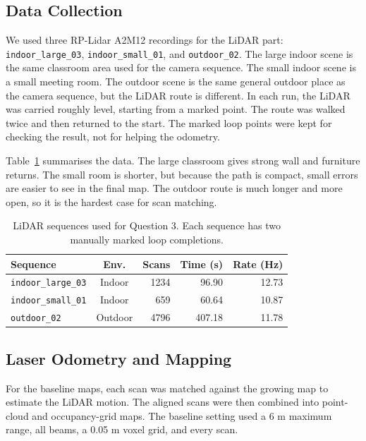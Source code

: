 \documentclass[conference]{IEEEtran}
\begin{document}
\subsection{Data Collection}

We used three RP-Lidar A2M12 recordings for the LiDAR part: \texttt{indoor\_large\_03}, \texttt{indoor\_small\_01}, and \texttt{outdoor\_02}. The large indoor scene is the same classroom area used for the camera sequence. The small indoor scene is a small meeting room. The outdoor scene is the same general outdoor place as the camera sequence, but the LiDAR route is different. In each run, the LiDAR was carried roughly level, starting from a marked point. The route was walked twice and then returned to the start. The marked loop points were kept for checking the result, not for helping the odometry.

Table~\ref{tab:q3_data_collection} summarises the data. The large classroom gives strong wall and furniture returns. The small room is shorter, but because the path is compact, small errors are easier to see in the final map. The outdoor route is much longer and more open, so it is the hardest case for scan matching.

\begin{table}[!t]
\caption{LiDAR sequences used for Question 3. Each sequence has two manually marked loop completions.}
\centering
\footnotesize
\begin{tabular}{lcrrr}
\toprule
Sequence & Env. & Scans & Time (s) & Rate (Hz) \\
\midrule
\texttt{indoor\_large\_03} & Indoor & 1234 & 96.90 & 12.73 \\
\texttt{indoor\_small\_01} & Indoor & 659 & 60.64 & 10.87 \\
\texttt{outdoor\_02} & Outdoor & 4796 & 407.18 & 11.78 \\
\bottomrule
\end{tabular}
\label{tab:q3_data_collection}
\end{table}

\subsection{Laser Odometry and Mapping}

For the baseline maps, each scan was matched against the growing map to estimate the LiDAR motion. The aligned scans were then combined into point-cloud and occupancy-grid maps. The baseline setting used a 6 m maximum range, all beams, a 0.05 m voxel grid, and every scan.
\end{document}
